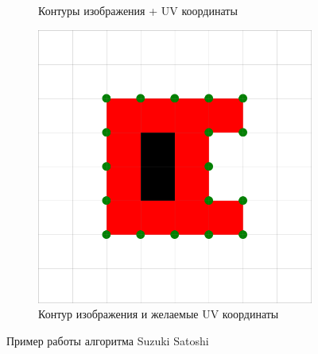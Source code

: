 \documentclass{fefu_thesis/cls/fefu}
\begin{document}
\begin{figure}[H]
\begin{subfigure}[t]{.33\linewidth}
            \caption{Контуры изображения + UV координаты}
        \end{subfigure}
        \begin{subfigure}[t]{.32\linewidth}
            \centering
            \includegraphics[scale=0.2]{images/SuzukiExample2_wanted_uvs.png}
            \caption{Контур изображения и желаемые UV координаты}
        \end{subfigure}
        \caption{Пример работы алгоритма Suzuki Satoshi}
    \end{figure}
\end{document}
